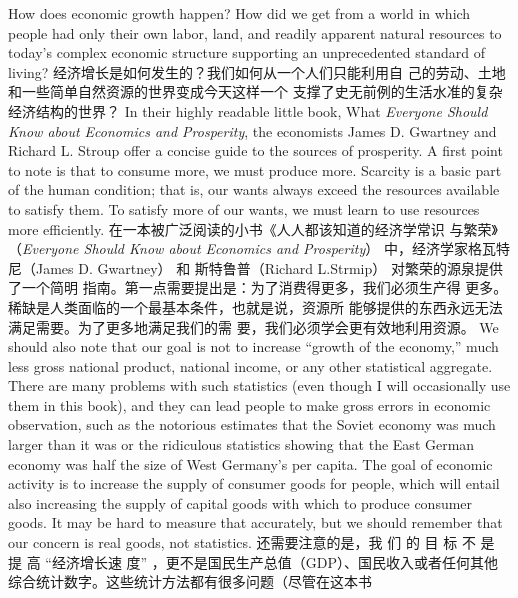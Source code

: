 \begin{paracol}{2}
How does economic growth happen? How did we get from a
world in which people had only their own labor, land, and readily apparent natural resources to today's complex economic
structure supporting an unprecedented standard of living?
\switchcolumn
经济增长是如何发生的？我们如何从一个人们只能利用自
己的劳动、土地和一些简单自然资源的世界变成今天这样一个
支撑了史无前例的生活水准的复杂经济结构的世界？
\switchcolumn*
In their highly readable little book, What \textit{Everyone Should Know about Economics and Prosperity}, the economists James D.
Gwartney and Richard L. Stroup offer a concise guide to the
sources of prosperity. A first point to note is that to consume
more, we must produce more. Scarcity is a basic part of the
human condition; that is, our wants always exceed the resources
available to satisfy them. To satisfy more of our wants, we must
learn to use resources more efficiently.
\switchcolumn
在一本被广泛阅读的小书《人人都该知道的经济学常识
与繁荣》（\textit{Everyone Should Know about Economics and Prosperity}） 中，经济学家格瓦特尼（James D. Gwartney） 和
斯特鲁普（Richard L.Strmip） 对繁荣的源泉提供了一个简明
指南。第一点需要提出是：为了消费得更多，我们必须生产得
更多。稀缺是人类面临的一个最基本条件，也就是说，资源所
能够提供的东西永远无法满足需要。为了更多地满足我们的需
要，我们必须学会更有效地利用资源。
\switchcolumn*
We should also note that our goal is not to increase ``growth
of the economy,'' much less gross national product, national income, or any other statistical aggregate. There are many problems with such statistics (even though I will occasionally use
them in this book), and they can lead people to make gross errors in economic observation, such as the notorious estimates
that the Soviet economy was much larger than it was or the
ridiculous statistics showing that the East German economy
was half the size of West Germany's per capita. The goal of economic activity is to increase the supply of consumer goods for
people, which will entail also increasing the supply of capital
goods with which to produce consumer goods. It may be hard
to measure that accurately, but we should remember that our
concern is real goods, not statistics.
\switchcolumn
还需要注意的是，我 们 的 目 标 不 是 提 高 “经济增长速
度” ，更不是国民生产总值（GDP）、国民收入或者任何其他
综合统计数字。这些统计方法都有很多问题（尽管在这本书

\end{paracol}
